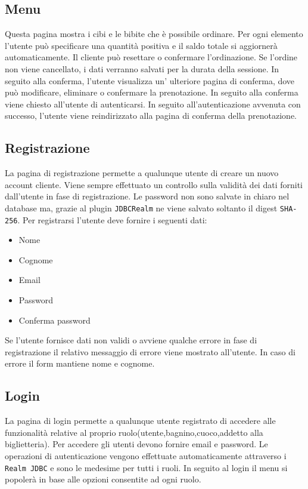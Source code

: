 \documentclass{article}
\begin{document}
\subsection{Menu}
Questa pagina mostra i cibi e le bibite che è possibile ordinare. Per ogni elemento l'utente può specificare una quantità positiva e il saldo totale si aggiornerà automaticamente. Il cliente può resettare o confermare l'ordinazione. Se l'ordine non viene cancellato, i dati verranno salvati per la durata della sessione. In seguito alla conferma, l'utente visualizza un' ulteriore pagina di conferma, dove può modificare, eliminare o confermare la prenotazione. In seguito alla conferma viene chiesto all'utente di autenticarsi. In seguito all'autenticazione avvenuta con successo, l'utente viene reindirizzato alla pagina di conferma della prenotazione.
\subsection{Registrazione}
La pagina di registrazione permette a qualunque utente di creare un nuovo account cliente. Viene sempre effettuato un controllo sulla validità dei dati forniti dall'utente in fase di registrazione. Le password non sono salvate in chiaro nel database ma, grazie al plugin \texttt{JDBCRealm} ne viene salvato soltanto il digest \texttt{SHA-256}.
Per registrarsi l'utente deve fornire i seguenti dati:
\begin{itemize}
	\item Nome
	\item Cognome
	\item Email
	\item Password
	\item Conferma password
\end{itemize}
Se l'utente fornisce dati non validi o avviene qualche errore in fase di registrazione il relativo messaggio di errore viene mostrato all'utente. In caso di errore il form mantiene nome e cognome.

\subsection{Login}
La pagina di login permette a qualunque utente registrato di accedere alle funzionalità relative al proprio ruolo(utente,bagnino,cuoco,addetto alla biglietteria). Per accedere gli utenti devono fornire email e password. Le operazioni di autenticazione vengono effettuate automaticamente attraverso i \texttt{Realm JDBC} e sono le medesime per tutti i ruoli. In seguito al login il menu si popolerà in base alle opzioni consentite ad ogni ruolo.
\end{document}
